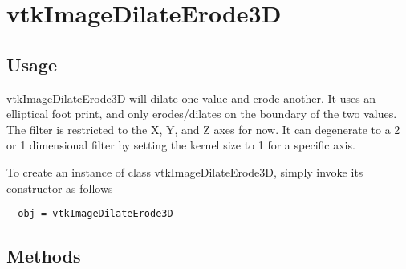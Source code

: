 \section{vtkImageDilateErode3D}

\subsection{Usage}

 vtkImageDilateErode3D will dilate one value and erode another.
 It uses an elliptical foot print, and only erodes/dilates on the
 boundary of the two values.  The filter is restricted to the 
 X, Y, and Z axes for now.  It can degenerate to a 2 or 1 dimensional
 filter by setting the kernel size to 1 for a specific axis.

To create an instance of class vtkImageDilateErode3D, simply
invoke its constructor as follows
\begin{verbatim}
  obj = vtkImageDilateErode3D
\end{verbatim}
\subsection{Methods}

